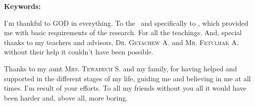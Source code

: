 \documentclass[
12pt, %
oneside, %
english, %
onehalfspacing, %
nolistspacing, %
liststotoc, %
parskip, %
headsepline, %
consistentlayout, %
]{MastersDoctoralThesis} %
\begin{document}
\textbf{Keywords:} \keywordnames

\begin{acknowledgements}
\addchaptertocentry{\acknowledgementname} %
I'm thankful to \textsc{GOD} in everything. To the \univname\, and specifically to \facname, which provided me with basic requirements of the research. For all the teachings. And, special thanks to my teachers and advisors, \textsc{Dr. Getachew A.} and \textsc{Mr. Fetulhak A.} without their help it couldn't have been possible.

Thanks to my aunt \textsc{Mrs. Tewabech S.} and my family, for having helped and supported in the different stages of my life, guiding me and believing in me at all times. I'm result of your efforts. To all my friends without you all it would have been harder and, above all, more boring.
\end{acknowledgements}


\tableofcontents %

\listoffigures %

\listoftables %

\end{document}
